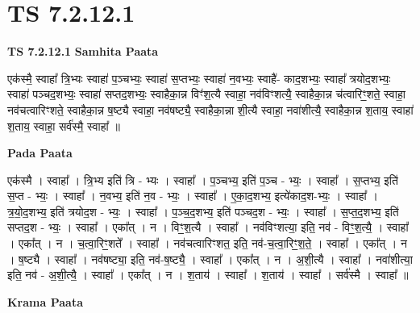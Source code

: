 \documentclass[17pt]{extarticle}
\begin{document}
\section{ TS 7.2.12.1 }

\textbf{TS 7.2.12.1 } \newline
\textbf{Samhita Paata} \newline

एक॑स्मै॒ स्वाहा᳚ त्रि॒भ्यः स्वाहा॑ प॒ञ्चभ्यः॒ स्वाहा॑ स॒प्तभ्यः॒ स्वाहा॑ न॒वभ्यः॒ स्वाहै॑- काद॒शभ्यः॒ स्वाहा᳚ त्रयोद॒शभ्यः॒ स्वाहा॑ पञ्चद॒शभ्यः॒ स्वाहा॑ सप्तद॒शभ्यः॒ स्वाहैका॒न्न विꣳ॑श॒त्यै स्वाहा॒ नव॑विꣳशत्यै॒ स्वाहैका॒न्न च॑त्वारिꣳ॒॒शते॒ स्वाहा॒ नव॑चत्वारिꣳशते॒ स्वाहैका॒न्न ष॒ष्ट्यै स्वाहा॒ नव॑षष्ट्यै॒ स्वाहैका॒न्ना शी॒त्यै स्वाहा॒ नवा॑शीत्यै॒ स्वाहैका॒न्न श॒ताय॒ स्वाहा॑ श॒ताय॒ स्वाहा॒ सर्व॑स्मै॒ स्वाहा᳚ ॥ \newline

\textbf{Pada Paata} \newline

एक॑स्मै । स्वाहा᳚ । त्रि॒भ्य इति॑ त्रि - भ्यः । स्वाहा᳚ । प॒ञ्चभ्य॒ इति॑ प॒ञ्च - भ्यः॒ । स्वाहा᳚ । स॒प्तभ्य॒ इति॑ स॒प्त - भ्यः॒ । स्वाहा᳚ । न॒वभ्य॒ इति॑ न॒व - भ्यः॒ । स्वाहा᳚ । ए॒का॒द॒शभ्य॒ इत्ये॑काद॒श-भ्यः॒ । स्वाहा᳚ । त्र॒यो॒द॒शभ्य॒ इति॑ त्रयोद॒श - भ्यः॒ । स्वाहा᳚ । प॒ञ्च॒द॒शभ्य॒ इति॑ पञ्चद॒श - भ्यः॒ । स्वाहा᳚ । स॒प्त॒द॒शभ्य॒ इति॑ सप्तद॒श - भ्यः॒ । स्वाहा᳚ । एका᳚त् । न । विꣳ॒॒श॒त्यै । स्वाहा᳚ । नव॑विꣳशत्या॒ इति॒ नव॑ - विꣳ॒॒श॒त्यै॒ । स्वाहा᳚ । एका᳚त् । न । च॒त्वा॒रिꣳ॒॒शते᳚ । स्वाहा᳚ । नव॑चत्वारिꣳशत॒ इति॒ नव॑-च॒त्वा॒रिꣳ॒॒श॒ते॒ । स्वाहा᳚ । एका᳚त् । न । ष॒ष्ट्यै । स्वाहा᳚ । नव॑षष्ट्या॒ इति॒ नव॑-ष॒ष्ट्यै॒ । स्वाहा᳚ । एका᳚त् । न । अ॒शी॒त्यै । स्वाहा᳚ । नवा॑शीत्या॒ इति॒ नव॑ - अ॒शी॒त्यै॒ । स्वाहा᳚ । एका᳚त् । न । श॒ताय॑ । स्वाहा᳚ । श॒ताय॑ । स्वाहा᳚ । सर्व॑स्मै । स्वाहा᳚ ॥  \newline


\textbf{Krama Paata} \newline
\end{document}

